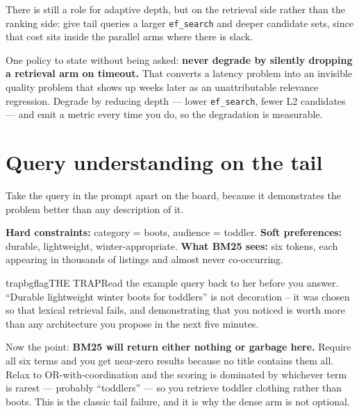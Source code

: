 \documentclass[10pt,twoside]{book}
\makeatletter
\newcommand{\cchapter}[1]{\chapter{#1}}
\newenvironment{callouttrap}{\begin{co@box}{trapbg}{flag}{THE TRAP}}{\end{co@box}}
\makeatother
\begin{document}
There is still a role for adaptive depth, but on the retrieval side rather than the ranking side: give tail queries a larger \texttt{ef\_search} and deeper candidate sets, since that cost sits inside the parallel arms where there is slack.\par
One policy to state without being asked: \textbf{never degrade by silently dropping a retrieval arm on timeout.} That converts a latency problem into an invisible quality problem that shows up weeks later as an unattributable relevance regression. Degrade by reducing depth --- lower \texttt{ef\_search}, fewer L2 candidates --- and emit a metric every time you do, so the degradation is measurable.\par
\cchapter{Query understanding on the tail}
Take the query in the prompt apart on the board, because it demonstrates the problem better than any description of it.\par
\par{}\par\medskip
\textbf{Hard constraints:} category = boots, audience = toddler. \textbf{Soft preferences:} durable, lightweight, winter-appropriate. \textbf{What BM25 sees:} six tokens, each appearing in thousands of listings and almost never co-occurring.\par
\begin{callouttrap}Read the example query back to her before you answer. ``Durable lightweight winter boots for toddlers'' is not decoration -- it was chosen so that lexical retrieval fails, and demonstrating that you noticed is worth more than any architecture you propose in the next five minutes.\end{callouttrap}
Now the point: \textbf{BM25 will return either nothing or garbage here.} Require all six terms and you get near-zero results because no title contains them all. Relax to OR-with-coordination and the scoring is dominated by whichever term is rarest --- probably ``toddlers'' --- so you retrieve toddler clothing rather than boots. This is the classic tail failure, and it is why the dense arm is not optional.\par
\end{document}
